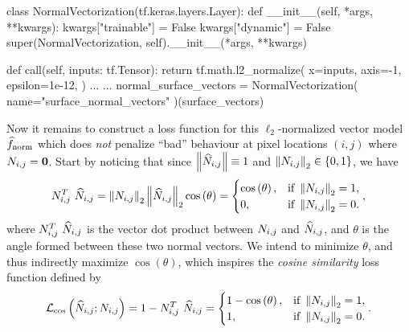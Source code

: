 \begin{listing}[H]
  \label{code:l2-normalization}
  \begin{pythoncode}
  class NormalVectorization(tf.keras.layers.Layer):
      def __init__(self, *args, **kwargs):
          kwargs["trainable"] = False
          kwargs["dynamic"] = False
          super(NormalVectorization, self).__init__(*args, **kwargs)

      def call(self, inputs: tf.Tensor):
          return tf.math.l2_normalize(
              x=inputs,
              axis=-1,
              epsilon=1e-12,
          )
  ...
  ...
  normal_surface_vectors = NormalVectorization(
      name="surface_normal_vectors"
  )(surface_vectors)
  \end{pythoncode}
\end{listing}
\noindent
Now it remains to construct a loss function for this $\ell_2$-normalized vector model $\widehat{f}_{\mathrm{norm}}$ which does \emph{not} penalize \enquote{bad} behaviour at pixel locations $(i,j)$ where $N_{i,j} = \boldsymbol{0}$.
Start by noticing that since $\left\lVert\widehat{N}_{i,j}\right\rVert \equiv 1$ and $\left\lVert N_{i,j}\right\rVert_2 \in \{0,1\}$, we have
%
\begin{equation*}
  N_{i,j}^T~\widehat{N}_{i,j}
  =
  \left\lVert N_{i,j}\right\rVert_2
  \left\lVert\widehat{N}_{i,j}\right\rVert_2
  \cos\left(\theta\right)
  =
  \begin{cases}
    \cos\left(\theta\right), &\text{if }\left\lVert N_{i,j}\right\rVert_2 = 1,\\
    0, &\text{if } \left\lVert N_{i,j}\right\rVert_2 = 0.\\
  \end{cases},
\end{equation*}
%
where $N_{i,j}^T~\widehat{N}_{i,j}$ is the vector dot product between $N_{i,j}$ and $\widehat{N}_{i,j}$, and $\theta$ is the angle formed between these two normal vectors.
We intend to minimize $\theta$, and thus indirectly maximize $\cos(\theta)$, which inspires the \textit{cosine similarity} loss function defined by
%
\begin{equation*}
  \mathcal{L}_{\cos}\left(\widehat{N}_{i,j}; N_{i,j}\right)
  =
  1 - N_{i,j}^T~\widehat{N}_{i,j}
  =
  \begin{cases}
    1 - \cos\left(\theta\right), &\text{if }\left\lVert N_{i,j}\right\rVert_2 = 1,\\
    1, &\text{if } \left\lVert N_{i,j}\right\rVert_2 = 0.\\
  \end{cases}.
\end{equation*}
